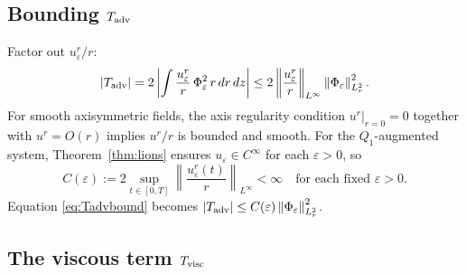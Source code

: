 \documentclass{article}
\theoremstyle{definition}
\theoremstyle{remark}
\newcommand{\e}{\varepsilon}
\newcommand{\norm}[1]{\left\|#1\right\|}
\begin{document}
\subsection{Bounding \texorpdfstring{$T_{\rm adv}$}{T-adv}}

Factor out $u_\e^r/r$:
\begin{equation}\label{eq:Tadvbound}
  |T_{\rm adv}|
  = 2\left|\int\frac{u_\e^r}{r}\,\Phi_\e^2\,r\,dr\,dz\right|
  \le 2\norm{\frac{u_\e^r}{r}}_{L^\infty}\norm{\Phi_\e}_{L^2_r}^2.
\end{equation}
For smooth axisymmetric fields, the axis regularity condition
$u^r|_{r=0} = 0$ together with $u^r = O(r)$ implies $u^r/r$ is bounded
and smooth.  For the $Q_1$-augmented system, Theorem~\ref{thm:lions}
ensures $u_\e \in C^\infty$ for each $\e > 0$, so
\begin{equation}\label{eq:Ce}
  C(\e) := 2\sup_{t\in[0,T]}\norm{\frac{u_\e^r(t)}{r}}_{L^\infty} < \infty
  \quad\text{for each fixed }\e > 0.
\end{equation}
Equation \eqref{eq:Tadvbound} becomes $|T_{\rm adv}| \le C(\e)\norm{\Phi_\e}_{L^2_r}^2$.

\subsection{The viscous term \texorpdfstring{$T_{\rm visc}$}{T-visc}}
\end{document}
